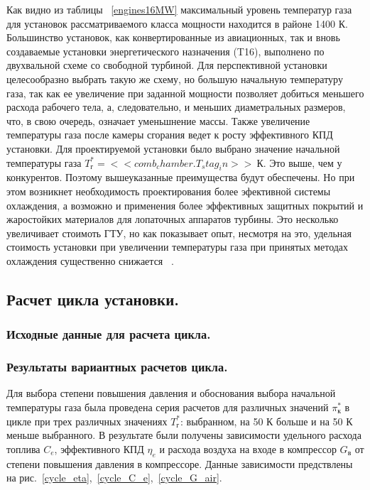 \documentclass[a4paper,12pt]{article}
\begin{document}
    Как видно из таблицы ~\ref{engines16MW} максимальный уровень температур газа для установок рассматриваемого
    класса мощности находится в районе 1400 К.
    Большинство установок, как конвертированные из авиационных, так и вновь создаваемые установки энергетического
    назначения (T16), выполнено по двухвальной схеме со свободной турбиной.
    Для перспективной установки целесообразно выбрать такую же схему, но большую начальную температуру газа,
    так как ее увеличение при заданной мощности позволяет добиться меньшего расхода рабочего тела, а, следовательно,
    и меньших диаметральных размеров, что, в свою очередь, означает уменьшнение массы.
    Также увеличение температуры газа после камеры сгорания ведет к росту эффективного КПД установки.
    Для проектируемой установки было выбрано значение начальной температуры газа $T_г^* = << comb_chamber.T_stag_in >>\ К$.
    Это выше, чем у конкурентов.
    Поэтому вышеуказанные преимущества будут обеспечены.
    Но при этом возникнет необходимость проектирования более эфективной системы охлаждения, а
    возможно и применения более эффективных защитных покрытий и жаростойких материалов для лопаточных
    аппаратов турбины.
    Это несколько увеличивает стоимоть ГТУ, но как показывает опыт, несмотря на это, удельная стоимость установки
    при увеличении температуры газа при принятых методах охлаждения существенно снижается ~\cite{manushin_eliseev_proektirovanie}.

    \newpage

    \subsection{Расчет цикла установки.}

    \subsubsection{Исходные данные для расчета цикла.}

    \subsubsection{Результаты вариантных расчетов цикла.}
    Для выбора степени повышения давления и обоснования выбора начальной температуры газа была проведена серия расчетов
    для различных значений $\pi_к^*$ в цикле при трех различных значениях $T_г^*$: выбранном, на 50 К больше и на 50 К
    меньше выбранного.
    В результате были получены зависимости удельного расхода топлива $C_e$, эффективного КПД $\eta_e$ и расхода
    воздуха на входе в компрессор $G_в$ от степени повышения давления в компрессоре.
    Данные зависимости предствлены на рис.~\ref{cycle_eta},~\ref{cycle_C_e},~\ref{cycle_G_air}.
\end{document}
